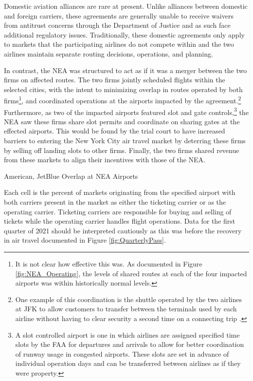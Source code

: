 \documentclass{article}
\begin{document}
	Domestic aviation alliances are rare at present. Unlike alliances between domestic and foreign carriers, these agreements are generally unable to receive waivers from antitrust concerns through the Department of Justice and as such face additional regulatory issues. Traditionally, these domestic agreements only apply to markets that the participating airlines do not compete within and the two airlines maintain separate routing decisions, operations, and planning. 
	
	In contrast, the NEA was structured to act as if it was a merger between the two firms on affected routes. The two firms jointly scheduled flights within the selected cities, with the intent to minimizing overlap in routes operated by both firms\footnote{It is not clear how effective this was. As documented in Figure \ref{fig:NEA_Operating}, the levels of shared routes at each of the four impacted airports was within historically normal levels.}, and coordinated operations at the airports impacted by the agreement.\footnote{One example of this coordination is the shuttle operated by the two airlines at JFK to allow customers to transfer between the terminals used by each airline without having to clear security a second time on a connecting trip \citep{griff_riding_2021}.} Furthermore, as two of the impacted airports featured slot and gate controls,\footnote{A slot controlled airport is one in which airlines are assigned specified time slots by the FAA for departures and arrivals to allow for better coordination of runway usage in congested airports. These slots are set in advance of individual operation days and can be transferred between airlines as if they were property.} the NEA saw these firms share slot permits and coordinate on sharing gates at the effected airports. This would be found by the trial court to have increased barriers to entering the New York City air travel market by deterring these firms by selling off landing slots to other firms. Finally, the two firms shared revenue from these markets to align their incentives with those of the NEA. 

    \begin{table}[h]
		\caption{American, JetBlue Overlap at NEA Airports}
		\label{tab:NEA_Airport_Prescence}
        \vspace{-15mm}
        \begin{center}
         
        \end{center}
                \vspace{-5mm}
		\footnotesize{Each cell is the percent of markets originating from the specified airport with both carriers present in the market as either the ticketing carrier or as the operating carrier. Ticketing carriers are responsible for buying and selling of tickets while the operating carrier handles flight operations. Data for the first quarter of 2021 should be interpreted cautiously as this was before the recovery in air travel documented in Figure \ref{fig:QuarterlyPass}.}
	\end{table}
    
\end{document}
